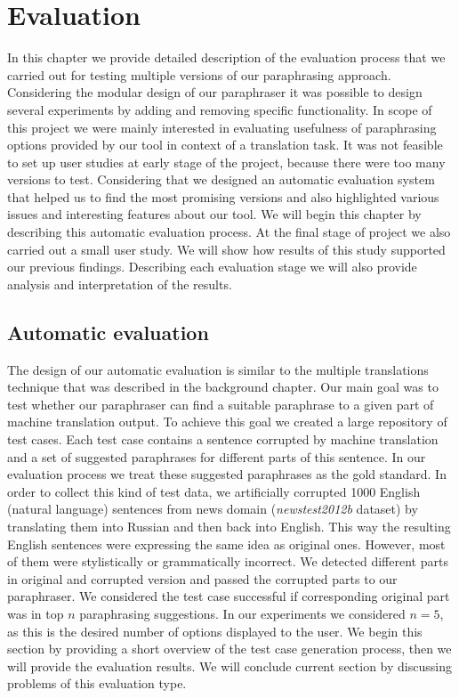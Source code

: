 
\chapter{Evaluation}

In this chapter we provide detailed description of the evaluation process that we carried out for testing multiple versions of our paraphrasing approach. Considering the modular design of our paraphraser it was possible to design several experiments by adding and removing specific functionality. In scope of this project we were mainly interested in evaluating usefulness of paraphrasing options provided by our tool in context of a translation task. It was not feasible to set up user studies at early stage of the project, because there were too many versions to test. Considering that we designed an automatic evaluation system that helped us to find the most promising versions and also highlighted various issues and interesting features about our tool. We will begin this chapter by describing this automatic evaluation process. At the final stage of project we also carried out a small user study. We will show how results of this study supported our previous findings. Describing each evaluation stage we will also provide analysis and interpretation of the results.

\section{Automatic evaluation}

The design of our automatic evaluation is similar to the multiple translations technique that was described in the background chapter. Our main goal was to test whether our paraphraser can find a suitable paraphrase to a given part of machine translation output. To achieve this goal we created a large repository of test cases. Each test case contains a sentence corrupted by machine translation and a set of suggested paraphrases for different parts of this sentence. In our evaluation process we treat these suggested paraphrases as the gold standard. In order to collect this kind of test data, we artificially corrupted 1000 English (natural language) sentences from news domain (\emph{newstest2012b} dataset) by translating them into Russian and then back into English. This way the resulting English sentences were expressing the same idea as original ones. However, most of them were stylistically or grammatically incorrect. We detected different parts in original and corrupted version and passed the corrupted parts to our paraphraser. We considered the test case successful if corresponding original part was in top $n$ paraphrasing suggestions. In our experiments we considered $n = 5$, as this is the desired number of options displayed to the user. We begin this section by providing a short overview of the test case generation process, then we will provide the evaluation results. We will conclude current section by discussing problems of this evaluation type.



